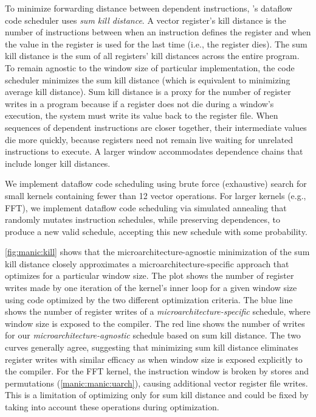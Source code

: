To minimize forwarding distance between dependent instructions, \manic's
dataflow code scheduler uses {\em sum kill distance}.  A vector register's
kill distance is the number of instructions between when an instruction defines
the register and when the value in the register is used for the last time
(i.e., the register dies).  The sum kill distance is the sum of all registers'
kill distances across the entire program. To remain agnostic to the window size
of particular \manic implementation, the code
scheduler minimizes the sum kill distance (which is equivalent to minimizing
average kill distance).  Sum kill distance is a proxy for the number of
register writes in a program because if a register does not die during a
window's execution, the system must write its value back to the register file.
%
When sequences of dependent instructions are closer together, their
intermediate values die more quickly, because registers need not remain live
waiting for unrelated instructions to execute.  A larger window accommodates
dependence chains that include longer kill distances.

We implement dataflow code scheduling using brute force (exhaustive) search
for small kernels containing fewer than 12 vector operations.  For larger
kernels (e.g., FFT), we implement dataflow code scheduling via simulated
annealing that randomly mutates instruction schedules, 
while preserving dependences, to produce a new valid schedule, accepting 
this new schedule with some probability.

\figMANICKill

\autoref{fig:manic:kill} shows that the microarchitecture-agnostic minimization of
the sum kill distance closely approximates a microarchitecture-specific
approach that optimizes for a particular window size.
%
The plot shows the number of register writes made by one iteration of the
kernel's inner loop for a given window size using code optimized by the two
different optimization criteria. 
%
The blue line shows the number of register writes of a \emph{microarchitecture-specific} schedule,
where window size is exposed to the compiler.  The red line shows the number of writes
for our \emph{microarchitecture-agnostic} schedule based on sum kill distance.
%
The two curves generally agree, suggesting that minimizing sum kill distance eliminates
register writes with similar efficacy as when window size is exposed explicitly to the compiler.
%
For the FFT kernel, the instruction window is broken by stores and permutations (\autoref{manic:manic:uarch}),
causing additional vector register file writes.
% 
This is a limitation of optimizing only for sum kill distance and could be fixed by taking into account these operations during optimization.
